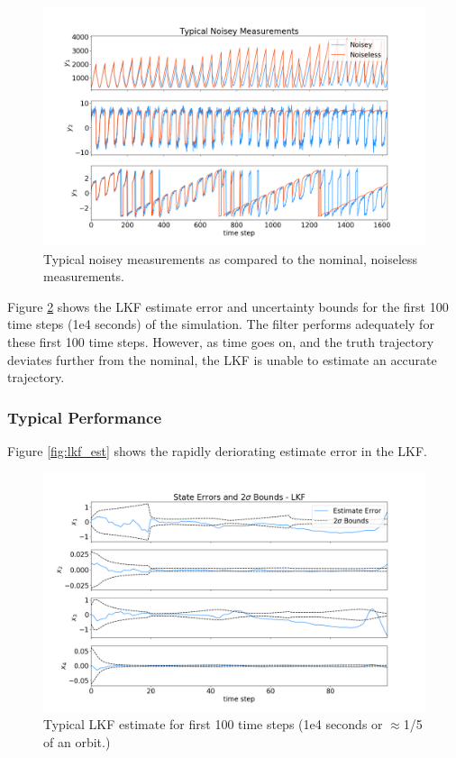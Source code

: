 \documentclass[11pt, a4paper]{article}
\begin{document}
\begin{figure}[H]
	\centering
	\includegraphics[width=\textwidth]{Figures/noisey_meas.png}
	\caption{Typical noisey measurements as compared to the nominal, noiseless measurements.}
	\label{fig:noisey_meas}
\end{figure}

Figure \ref{fig:lkf_est_zoom} shows the LKF estimate error and uncertainty bounds for the first 100 time steps (1e4 seconds) of the simulation. 
The filter performs adequately for these first 100 time steps.
However, as time goes on, and the truth trajectory deviates further from the nominal, the LKF is unable to estimate an accurate trajectory. 
\subsubsection{Typical Performance}
Figure \ref{fig:lkf_est} shows the rapidly deriorating estimate error in the LKF.  

\begin{figure}[H]
	\centering
	\includegraphics[width=\textwidth]{Figures/lkf_estimate_th_ZOOM.png}
	\caption{Typical LKF estimate for first 100 time steps (1e4 seconds or $\approx$1/5 of an orbit.)}
	\label{fig:lkf_est_zoom}
\end{figure}
\end{document}
